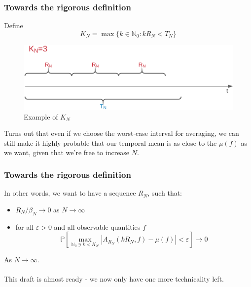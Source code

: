 \documentclass{beamer}
\begin{document}
\begin{frame}
    \frametitle{Towards the rigorous definition}
    Define 
    \[K_N = \max\{k \in \mathbb{N}_0: kR_N < T_N\}\]
    \begin{figure}[H]
        \centering
        \includegraphics[scale=0.2]{./img/kn_rn.png}
        \caption{Example of $K_N$}
        \label{fig:kn_rn}
    \end{figure}
    Turns out that even if we choose the worst-case interval for averaging, we can still make it highly probable that our temporal mean is as close to the $\mu(f)$ 
    as we want, given that we're free to increase $N$. 
\end{frame}

\begin{frame}
    \frametitle{Towards the rigorous definition}
    In other words, we want to have a sequence $R_N$, such that:
    \begin{itemize}
        \item $R_N / \beta_N \rightarrow 0$ as $N \rightarrow \infty$
        \item for all $\varepsilon > 0$ and all observable quantities $f$
        \[
            \mathbb{P}\left[ \max_{\mathbb{N}_0 \ni k < K_N}|A_{R_N}(kR_N, f) - \mu(f)| < \varepsilon\right] \rightarrow 0
        \]
    \end{itemize}

    As $N \rightarrow \infty$. \\~\\
    This draft is almost ready - we now only have one more technicality left.
\end{frame}
\end{document}
